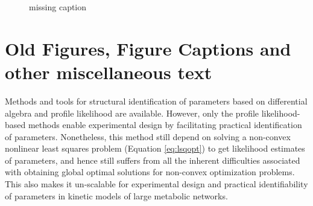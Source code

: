\documentclass[10pt]{article}
\begin{document}
	\begin{figure}[!tbhp]
		\caption{missing caption}%
	\end{figure}
	
	\clearpage

	\section{Old Figures, Figure Captions and other miscellaneous text}	
	Methods and tools for structural identification of parameters based on differential algebra \parencite{Ljung1994, Audoly2001, Bellu2007} and profile likelihood \parencite{Raue2014} are available. However, only the profile likelihood-based methods enable experimental design by facilitating practical identification of parameters. Nonetheless, this method still depend on solving a non-convex nonlinear least squares problem (Equation \ref{eq:lsqopt}) to get likelihood estimates of parameters, and hence still suffers from all the inherent difficulties associated with obtaining global optimal solutions for non-convex optimization problems. This also makes it un-scalable for experimental design and practical identifiability of parameters in kinetic models of large metabolic networks.	
	
\end{document}
